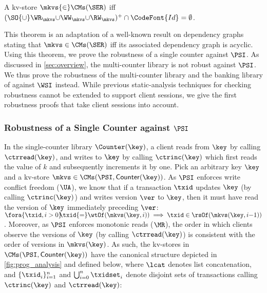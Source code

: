\spaceshrink{-3pt}
\begin{theorem}
\label{thm:serialisable_nocycle}
A kv-store $\mkvs {\in} \CMs(\SER)$ iff $(\SO {\cup} \WR_{\mkvs} 
{\cup} \WW_{\mkvs} {\cup} \RW_{\mkvs})^{+} \cap \CodeFont{Id} = \emptyset$.%
\end{theorem}
\spaceshrink{-3pt}

This theorem is an adaptation of a well-known result on
dependency graphs~\cite{adya} stating that $\mkvs \in \CMs(\SER)$ iff its associated dependency graph is acyclic. 
Using this theorem, we prove the robustness of a single counter against $\PSI$.
As discussed in \cref{sec:overview}, the multi-counter library is not robust against $\PSI$. 
We thus prove the robustness of the multi-counter library and the banking library of \citet{bank-example-wsi} against $\WSI$ instead. 
While previous static-analysis techniques for checking robustness \citep{giovanni_concur16,SIanalysis,laws,sureshConcur}
cannot be extended to support client sessions, 
we give the first robustness proofs that take client sessions into account.



\subsubsection{Robustness of a Single Counter against $\PSI$}
In the single-counter library $\Counter(\key)$, 
a client reads from $\key$ by calling $\ctrread(\key)$, and writes to $\key$ by calling $\ctrinc(\key)$ which first reads the value of $k$ and subsequently increments it by one.
Pick an arbitrary key $\key$ and a kv-store $\mkvs \in \CMs(\PSI, \mathsf{Counter}(\key))$.
As $\PSI$ enforces write conflict freedom (\(\UA\)), we know that if a transaction $\txid$ updates $\key$ (by calling $\ctrinc(\key)$) and writes version $\ver$ to $\key$, then it must have read the version of $\key$ immediately preceding $\ver$:
$\fora{\txid, i > 0}\!\! \txid {=} \wtOf(\mkvs(\key, i)) \implies \txid \in \rsOf(\mkvs(\key, i{-}1))$. 
Moreover, as $\PSI$ enforces monotonic reads ($\MR$),
the order in which clients observe the versions of $\key$ (by calling $\ctrread(\key)$)
is consistent with the order of versions in $\mkvs(\key)$. 
As such, the kv-stores in $\CMs(\PSI, \mathsf{Counter}(\key))$ have the canonical structure depicted in  \cref{fig:prog_analysis} and defined below, where $\lcat$ denotes list concatenation, and 
$\{\txid^{\mathsf{}}_{i}\}_{i=1}^{n}$ and $\bigcup_{i=0}^{n} \txidset^{\mathsf{}}_{i}$ 
denote disjoint sets of transactions calling $\ctrinc(\key)$ and $\ctrread(\key)$: 

